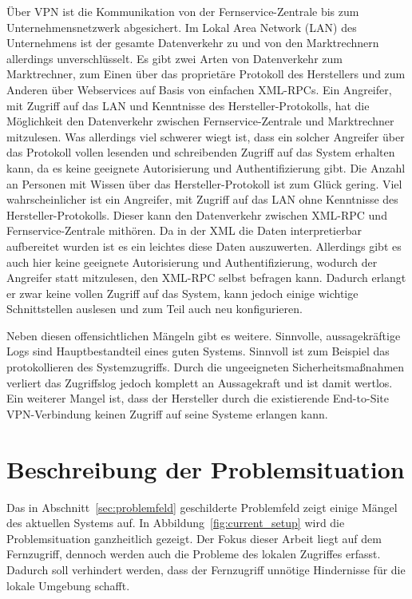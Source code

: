 \documentclass[11pt,a4paper]{report}
\begin{document}
Über VPN ist die Kommunikation von der Fernservice-Zentrale bis zum Unternehmensnetzwerk abgesichert. Im Lokal Area Network (LAN) des Unternehmens ist der gesamte Datenverkehr zu und von den Marktrechnern allerdings unverschlüsselt. Es gibt zwei Arten von Datenverkehr zum Marktrechner, zum Einen über das proprietäre Protokoll des Herstellers und zum Anderen über Webservices auf Basis von einfachen XML-RPCs. Ein Angreifer, mit Zugriff auf das LAN und Kenntnisse des Hersteller-Protokolls, hat die Möglichkeit den Datenverkehr zwischen Fernservice-Zentrale und Marktrechner mitzulesen. Was allerdings viel schwerer wiegt ist, dass ein solcher Angreifer über das Protokoll vollen lesenden und schreibenden Zugriff auf das System erhalten kann, da es keine geeignete Autorisierung und Authentifizierung gibt. Die Anzahl an Personen mit Wissen über das Hersteller-Protokoll ist zum Glück gering. Viel wahrscheinlicher ist ein Angreifer, mit Zugriff auf das LAN ohne Kenntnisse des Hersteller-Protokolls. Dieser kann den Datenverkehr zwischen XML-RPC und Fernservice-Zentrale mithören. Da in der XML die Daten interpretierbar aufbereitet wurden ist es ein leichtes diese Daten auszuwerten. Allerdings gibt es auch hier keine geeignete Autorisierung und Authentifizierung, wodurch der Angreifer statt mitzulesen, den XML-RPC selbst befragen kann. Dadurch erlangt er zwar keine vollen Zugriff auf das System, kann jedoch einige wichtige Schnittstellen auslesen und zum Teil auch neu konfigurieren. 

Neben diesen offensichtlichen Mängeln gibt es weitere. Sinnvolle, aussagekräftige Logs sind Hauptbestandteil eines guten Systems. Sinnvoll ist zum Beispiel das protokollieren des Systemzugriffs. Durch die ungeeigneten Sicherheitsmaßnahmen verliert das Zugriffslog jedoch komplett an Aussagekraft und ist damit wertlos. Ein weiterer Mangel ist, dass der Hersteller durch die existierende End-to-Site VPN-Verbindung keinen Zugriff auf seine Systeme erlangen kann. 


\section{Beschreibung der Problemsituation}

Das in Abschnitt~\ref{sec:problemfeld} geschilderte Problemfeld zeigt einige Mängel des aktuellen Systems auf. In Abbildung~\ref{fig:current_setup} wird die Problemsituation ganzheitlich gezeigt. Der Fokus dieser Arbeit liegt auf dem Fernzugriff, dennoch werden auch die Probleme des lokalen Zugriffes erfasst. Dadurch soll verhindert werden, dass der Fernzugriff unnötige Hindernisse für die lokale Umgebung schafft. 
\end{document}
